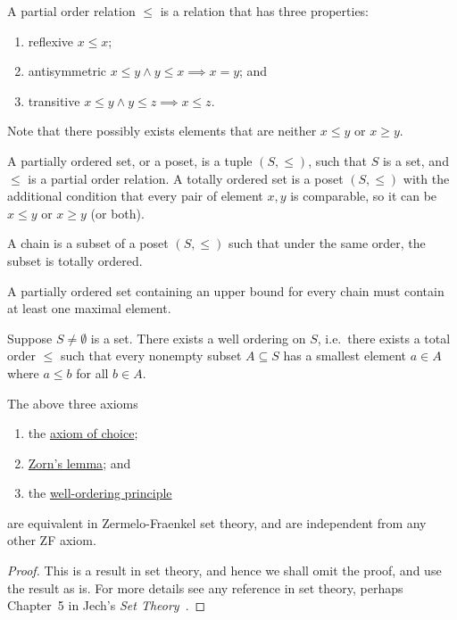 \begin{definition}
    A partial order relation \(\leq\) is a relation that has three properties:
    \begin{enumerate}[label={(\roman*)}, itemsep=0mm]
        \item reflexive \(x \leq x\);
        \item antisymmetric \(x \leq y \land y \leq x \implies x = y\); and
        \item transitive \(x \leq y \land y \leq z \implies x \leq z\).
    \end{enumerate}
    Note that there possibly exists elements
    that are neither \(x \leq y\) or \(x \geq y\).
\end{definition}
\begin{definition}
    A partially ordered set, or a poset,
    is a tuple \((S,\leq)\),
    such that \(S\) is a set,
    and \(\leq\) is a partial order relation.
    A totally ordered set is a poset \((S,\leq)\)
    with the additional condition that every pair of element \(x,y\) is comparable,
    so it can be \(x \leq y\) or \(x \geq y\) (or both).
\end{definition}
\begin{definition}
    A chain is a subset of a poset \((S,\leq)\)
    such that under the same order, the subset is totally ordered.
\end{definition}
\begin{axiom}\label{ax:zorn}
    A partially ordered set containing an upper bound for every chain
    must contain at least one maximal element.
\end{axiom}

\begin{axiom}\label{ax:well-order}
    Suppose \(S \neq \emptyset\) is a set.
    There exists a well ordering on \(S\),
    i.e.\ there exists a total order \(\leq\)
    such that every nonempty subset \(A \subseteq S\)
    has a smallest element \(a \in A\) where \(a \leq b\) for all \(b \in A\).
\end{axiom}

\begin{theorem}
    The above three axioms
    \begin{enumerate}[label={(\roman*)}, itemsep=0mm]
        \item the \hyperref[ax:choice]{axiom of choice};
        \item \hyperref[ax:zorn]{Zorn's lemma}; and
        \item the \hyperref[ax:well-order]{well-ordering principle}
    \end{enumerate}
    are equivalent in Zermelo-Fraenkel set theory,
    and are independent from any other ZF axiom.
\end{theorem}
\begin{proof}
    This is a result in set theory, and hence we shall omit the proof,
    and use the result as is.
    For more details see any reference in set theory,
    perhaps Chapter~5 in Jech's \textit{Set Theory}~\cite{jech}.
\end{proof}



